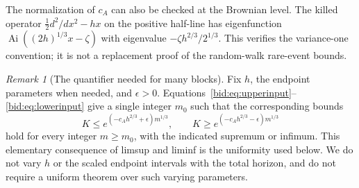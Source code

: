 \documentclass[11pt,letterpaper]{article}
\numberwithin{equation}{section}
\theoremstyle{remark}\newtheorem{remark}[theorem]{Remark}
\DeclareMathOperator{\Ai}{Ai}
\begin{document}
The normalization of $c_A$ can also be checked at the Brownian level.
The killed operator $\tfrac12 d^2/dx^2-hx$ on the positive half-line
has eigenfunction $\Ai((2h)^{1/3}x-\zeta)$ with eigenvalue
$-\zeta h^{2/3}/2^{1/3}$. This verifies the variance-one convention; it
is not a replacement proof of the random-walk rare-event bounds.

\begin{remark}[The quantifier needed for many blocks]\label{bid:rem:quantifier}
Fix $h$, the endpoint parameters when needed, and $\epsilon>0$.
Equations~\eqref{bid:eq:upperinput}--\eqref{bid:eq:lowerinput} give a single
integer $m_0$ such that the corresponding bounds
\[
 K\leq e^{(-c_Ah^{2/3}+\epsilon)m^{1/3}},\qquad
 K\geq e^{(-c_Ah^{2/3}-\epsilon)m^{1/3}}
\]
hold for every integer $m\geq m_0$, with the indicated supremum or
infimum. This elementary consequence of limsup and liminf is the
uniformity used below. We do not vary $h$ or the scaled endpoint
intervals with the total horizon, and do not require a uniform theorem
over such varying parameters.
\end{remark}
\end{document}
